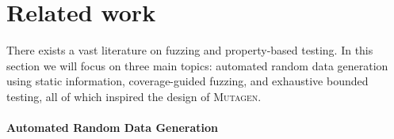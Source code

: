 \documentclass[sigconf, anonymous, review]{acmart}
\newcommand{\mutagen}{\textsc{Mutagen}\xspace}
\begin{document}






\section{Related work}
\label{sec:related}

There exists a vast literature on fuzzing and property-based testing.
%
In this section we will focus on three main topics:
%
automated random data generation using static information,
%
coverage-guided fuzzing, and
%
exhaustive bounded testing, all of which inspired the design of \mutagen.


\paragraph{Automated Random Data Generation}
\end{document}
